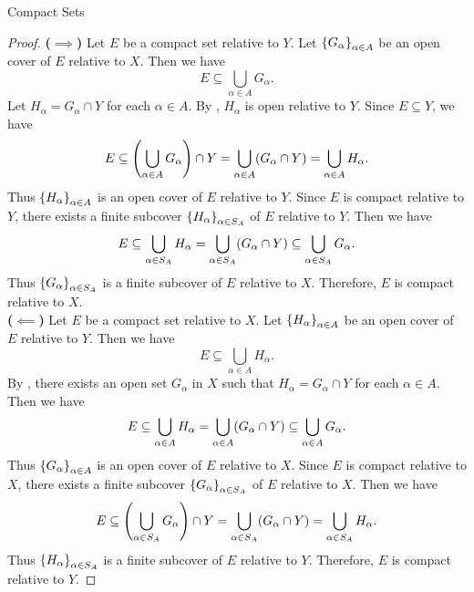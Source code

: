\begin{section}{Compact Sets}
\begin{proof}
    \textbf{($\implies$)} Let $E$ be a compact set relative to $Y$. Let
    $\set*{G_{\alpha}}_{\alpha \in A}$ be an open cover of $E$ relative to $X$. Then we have
    \[
    E \subseteq \bigcup_{\alpha \in A} G_{\alpha}.
    \]
    Let $H_{\alpha} = G_{\alpha} \cap Y$ for each $\alpha \in A$. By ,
    $H_{\alpha}$ is open relative to $Y$. Since $E \subseteq Y$, we have
    \[
    E \subseteq \paren*{\bigcup_{\alpha \in A} G_{\alpha}} \cap Y =
    \bigcup_{\alpha \in A} \paren*{G_{\alpha} \cap Y} = \bigcup_{\alpha \in A} H_{\alpha}.
    \]
    Thus $\set*{H_{\alpha}}_{\alpha \in A}$ is an open cover of $E$ relative to $Y$. Since $E$ is compact relative
    to $Y$, there exists a finite subcover $\set*{H_{\alpha}}_{\alpha \in S_{A}}$ of $E$ relative to $Y$. Then we have
    \[
    E \subseteq \bigcup_{\alpha \in S_{A}} H_{\alpha} = \bigcup_{\alpha \in S_{A}}
    \paren*{G_{\alpha} \cap Y} \subseteq \bigcup_{\alpha \in S_{A}} G_{\alpha}.
    \]
    Thus $\set*{G_{\alpha}}_{\alpha \in S_{A}}$ is a finite subcover of $E$ relative to $X$.
    Therefore, $E$ is compact relative to $X$.
    \\[6mm]
    \textbf{($\impliedby$)} Let $E$ be a compact set relative to $X$. Let $\set*{H_{\alpha}}_{\alpha \in A}$ be an open
    cover of $E$ relative to $Y$. Then we have
    \[
    E \subseteq \bigcup_{\alpha \in A} H_{\alpha}.
    \]
    By , there exists an open set $G_{\alpha}$ in $X$ such that $H_{\alpha} =
    G_{\alpha} \cap Y$ for each $\alpha \in A$. Then we have
    \[
    E \subseteq \bigcup_{\alpha \in A} H_{\alpha} = \bigcup_{\alpha \in A} \paren*{G_{\alpha} \cap Y}
    \subseteq \bigcup_{\alpha \in A} G_{\alpha}.
    \]
    Thus $\set*{G_{\alpha}}_{\alpha \in A}$ is an open cover of $E$ relative to $X$. Since $E$ is compact relative to $X$,
    there exists a finite subcover $\set*{G_{\alpha}}_{\alpha \in S_{A}}$ of $E$ relative to $X$. Then we have
    \[
    E \subseteq \paren*{\bigcup_{\alpha \in S_{A}} G_{\alpha}} \cap Y = \bigcup_{\alpha \in S_{A}}
    \paren*{G_{\alpha} \cap Y} = \bigcup_{\alpha \in S_{A}} H_{\alpha}.
    \]
    Thus $\set*{H_{\alpha}}_{\alpha \in S_{A}}$ is a finite subcover of $E$ relative to $Y$.
    Therefore, $E$ is compact relative to $Y$.
\end{proof}

\bigskip


\end{section}
